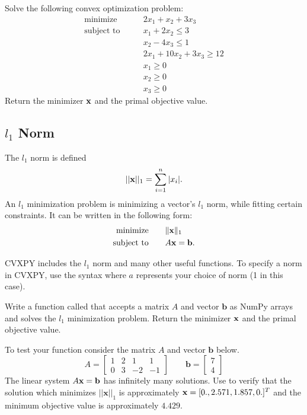 \begin{problem}
Solve the following convex optimization problem:
\begin{align*}
\text{minimize}\qquad &2x_1+x_2+3x_3 \\
\text{subject to}\qquad &x_1+2x_2 \leq 3 \\
		&x_2-4x_3\leq 1\\
	        &2x_1+10x_2+3x_3 \geq 12 \\
		&x_1 \geq 0 \\
		&x_2 \geq 0 \\
		&x_3 \geq 0
\end{align*}
Return the minimizer $\mathbf{x}$ and the primal objective value.
\end{problem}
\pagebreak
\subsection*{$l_1$ Norm}
The $l_1$ norm is defined 
\[||\mathbf{x}||_1=\sum_{i=1}^n |x_i|.\]
An $l_1$ minimization problem is minimizing a vector's $l_1$ norm, while fitting certain constraints. It can be written in the following form:
\begin{align*}
\text{minimize}\qquad &\|\mathbf{x}\|_1\\
\text{subject to} \qquad &A\mathbf{x} = \mathbf{b}.
\end{align*}

CVXPY includes the $l_1$ norm and many other useful functions.
To specify a norm in CVXPY, use the syntax  where $a$ represents your choice of norm (1 in this case).

\begin{problem}
Write a function called  that accepts a matrix $A$ and vector $\mathbf{b}$ as NumPy arrays and solves the $l_1$ minimization problem.
Return the minimizer $\mathbf{x}$ and the primal objective value.

To test your function consider the matrix $A$ and vector $\mathbf{b}$ below.
\[
A = \begin{bmatrix}
1 & 2 & 1 & 1\\
0 & 3 & -2 & -1
\end{bmatrix} \qquad
\mathbf{b} = \begin{bmatrix}
7 \\
4
\end{bmatrix}
\]
The linear system $A\mathbf{x} = \mathbf{b}$ has infinitely many solutions.
Use  to verify that the solution which minimizes $||\mathbf{x}||_1$ is approximately $\mathbf{x} = [0., 2.571, 1.857, 0.]^T$ and the minimum objective value is approximately $4.429$.
\label{prob:l1}
\end{problem}

